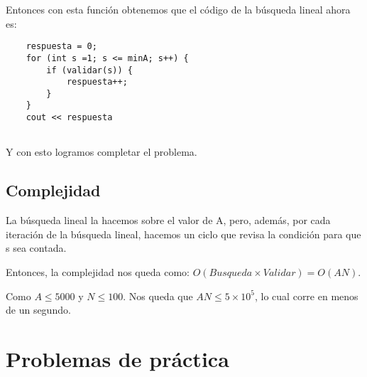 Entonces con esta función obtenemos que el código de la búsqueda lineal ahora es:
\begin{lstlisting}
	respuesta = 0;
	for (int s =1; s <= minA; s++) {
		if (validar(s)) {
			respuesta++;
		}
	}
	cout << respuesta
	
\end{lstlisting}

Y con esto logramos completar el problema.

\subsection{Complejidad}
La búsqueda lineal la hacemos sobre el valor de A, pero, además, por cada iteración de la búsqueda lineal, hacemos un ciclo que revisa la condición para que s sea contada.

Entonces, la complejidad nos queda como:   \(O(Busqueda\times Validar)=O(AN)\).

Como \(A\leq 5000\) y \(N\leq 100\). Nos queda que \(AN\leq 5\times 10^5\), lo cual corre en menos de un segundo.


\section*{Problemas de práctica}


\begin{exercise}
\end{exercise}

\begin{exercise}
\end{exercise}

\begin{exercise}
\end{exercise}
